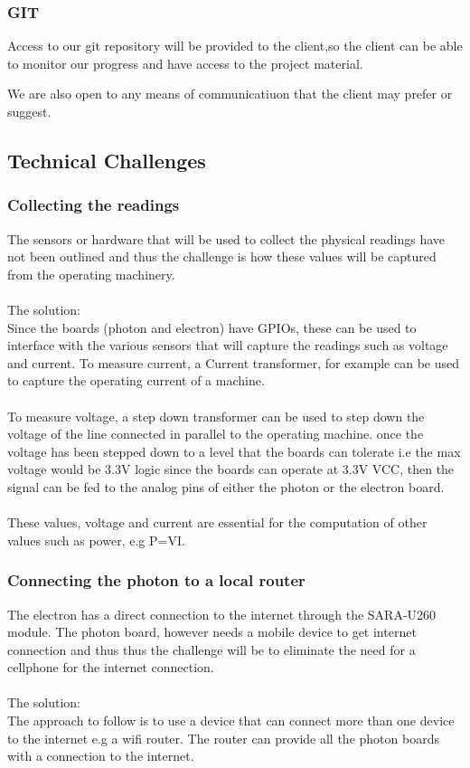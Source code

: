 \documentclass{scrartcl}
\begin{document}
\subsubsection{GIT}

Access to our git repository will be provided to the client,so the client can be able to monitor
our progress and have access to the project material.

We are also open to any means of communicatiuon that the client may prefer or suggest.

\subsection{Technical Challenges}
\subsubsection{Collecting the readings}
The sensors or hardware that will be used to collect the physical readings have not been outlined and thus the challenge is how these values will be captured from the operating machinery.\\ \\
The solution:\\ 
Since the boards (photon and electron) have GPIOs, these can be used to interface with the various sensors that will capture the readings such as voltage and current. To measure current, a Current transformer, for example can be used to capture the operating current of a machine.\\
\\
To measure voltage, a step down transformer can be used to step down the voltage of the line connected in parallel to the operating machine. once the voltage has been stepped down to a level that the boards can tolerate i.e the max voltage would be 3.3V logic since the boards can operate at 3.3V VCC, then the signal can be fed to the analog pins of either the photon or the electron board.
\\ \\
These values, voltage and current are essential for the computation of other values such as power, e.g P=VI. 

\subsubsection{Connecting the photon to a local router}
The electron has a direct connection to the internet through the SARA-U260 module. The photon board, however needs a mobile device to get internet connection and thus thus the challenge will be to eliminate the need for a cellphone for the internet connection.\\ \\
The solution:\\
The approach to follow is to use a device that can connect more than one device to the internet e.g a wifi router. The router can provide all the photon boards with a connection to the internet. 
\end{document}
